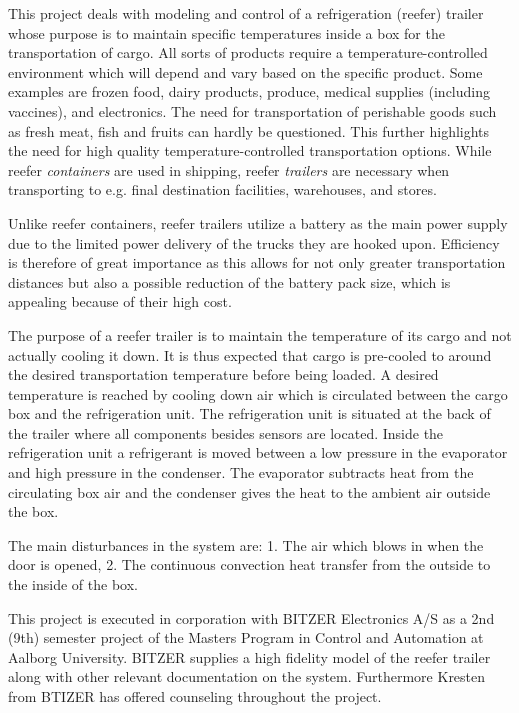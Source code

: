 This project deals with modeling and control of a refrigeration (reefer) trailer whose purpose is to maintain specific temperatures inside a box for the transportation of cargo. All sorts of products require a temperature-controlled environment which will depend and vary based on the specific product. Some examples are frozen food, dairy products, produce, medical supplies (including vaccines), and electronics. The need for transportation of perishable goods such as fresh meat, fish and fruits can hardly be questioned. This further highlights the need for high quality temperature-controlled transportation options. While reefer \textit{containers} are used in shipping, reefer \textit{trailers} are necessary when transporting to e.g. final destination facilities, warehouses, and stores.

Unlike reefer containers, reefer trailers utilize a battery as the main power supply due to the limited power delivery of the trucks they are hooked upon. Efficiency is therefore of great importance as this allows for not only greater transportation distances but also a possible reduction of the battery pack size, which is appealing because of their high cost.

The purpose of a reefer trailer is to maintain the temperature of its cargo and not actually cooling it down. It is thus expected that cargo is pre-cooled to around the desired transportation temperature before being loaded. A desired temperature is reached by cooling down air which is circulated between the cargo box and the refrigeration unit. The refrigeration unit is situated at the back of the trailer where all components besides sensors are located. Inside the refrigeration unit a refrigerant is moved between a low pressure in the evaporator and high pressure in the condenser. The evaporator subtracts heat from the circulating box air and the condenser gives the heat to the ambient air outside the box.

The main disturbances in the system are: 1. The air which blows in when the door is opened, 2. The continuous convection heat transfer from the outside to the inside of the box.

This project is executed in corporation with BITZER Electronics A/S as a 2nd (9th) semester project of the Masters Program in Control and Automation at Aalborg University. BITZER supplies a high fidelity model of the reefer trailer along with other relevant documentation on the system. Furthermore Kresten from BTIZER has offered counseling throughout the project.

